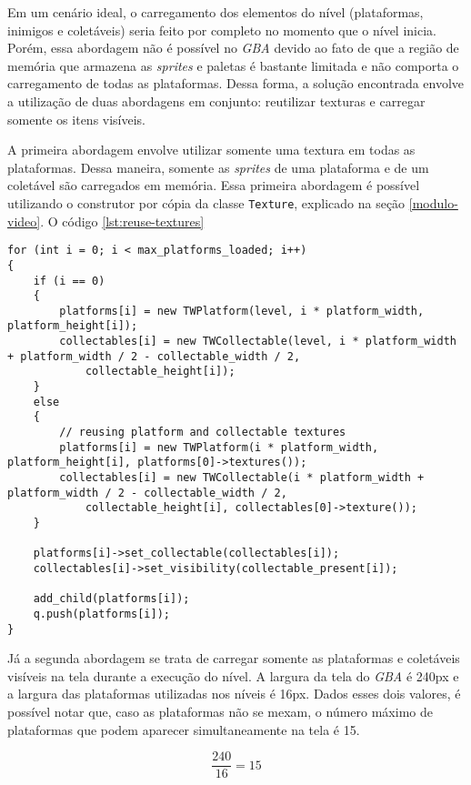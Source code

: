 Em um cenário ideal, o carregamento dos elementos do nível (plataformas, inimigos e coletáveis) seria feito por completo no momento que o nível inicia. Porém, essa abordagem não é possível no \textit{GBA} devido ao fato de que a região de memória que armazena as \textit{sprites} e paletas é bastante limitada e não comporta o carregamento de todas as plataformas. Dessa forma, a solução encontrada envolve a utilização de duas abordagens em conjunto: reutilizar texturas e carregar somente os itens visíveis.

A primeira abordagem envolve utilizar somente uma textura em todas as plataformas. Dessa maneira, somente as \textit{sprites} de uma plataforma e de um coletável são carregados em memória. Essa primeira abordagem é possível utilizando o construtor por cópia da classe \texttt{Texture}, explicado na seção \ref{modulo-video}. O código \ref{lst:reuse-textures}

\begin{lstlisting}[caption={Implementação da reutilização das \textit{sprites} de uma plataforma},label={lst:reuse-textures}]
for (int i = 0; i < max_platforms_loaded; i++)
{
    if (i == 0)
    {
        platforms[i] = new TWPlatform(level, i * platform_width, platform_height[i]);
        collectables[i] = new TWCollectable(level, i * platform_width + platform_width / 2 - collectable_width / 2,
            collectable_height[i]);
    }
    else
    {
        // reusing platform and collectable textures
        platforms[i] = new TWPlatform(i * platform_width, platform_height[i], platforms[0]->textures());
        collectables[i] = new TWCollectable(i * platform_width + platform_width / 2 - collectable_width / 2,
            collectable_height[i], collectables[0]->texture());
    }

    platforms[i]->set_collectable(collectables[i]);
    collectables[i]->set_visibility(collectable_present[i]);

    add_child(platforms[i]);
    q.push(platforms[i]);
}
\end{lstlisting}

Já a segunda abordagem se trata de carregar somente as plataformas e coletáveis visíveis na tela durante a execução do nível. A largura da tela do \textit{GBA} é 240px e a largura das plataformas utilizadas nos níveis é 16px. Dados esses dois valores, é possível notar que, caso as plataformas não se mexam, o número máximo de plataformas que podem aparecer simultaneamente na tela é 15.

\begin{equation}
\label{maxplats}
\frac{240}{16} = 15
\end{equation}

